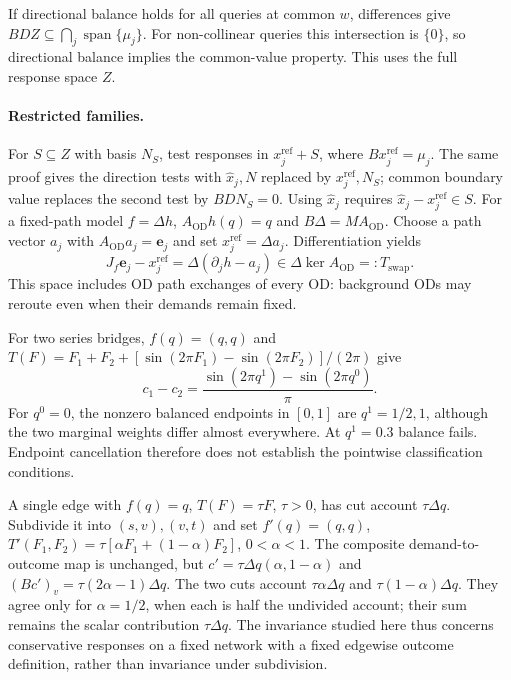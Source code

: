 If directional balance holds for all
queries at common $w$, differences give
$BDZ\subseteq\bigcap_j\operatorname{span}\{\mu_j\}$. For non-collinear
queries this intersection is $\{0\}$, so directional balance implies
the common-value property. This uses the full response space $Z$.

\paragraph{Restricted families.}\label{app:membership}
For $S\subseteq Z$ with basis $N_S$, test responses in
$x_j^{\mathrm{ref}}+S$, where $Bx_j^{\mathrm{ref}}=\mu_j$.
The same proof gives the direction tests with $\hat x_j,N$ replaced
by $x_j^{\mathrm{ref}},N_S$; common boundary value replaces the second test by
$BDN_S=0$. Using $\hat x_j$ requires
$\hat x_j-x_j^{\mathrm{ref}}\in S$. For a fixed-path model $f=\Delta h$,
$A_{\mathrm{OD}}h(q)=q$ and $B\Delta=MA_{\mathrm{OD}}$. Choose a path
vector $a_j$ with $A_{\mathrm{OD}}a_j=\mathbf e_j$ and set
$x_j^{\mathrm{ref}}=\Delta a_j$. Differentiation yields
\[
J_f\mathbf e_j-x_j^{\mathrm{ref}}
=\Delta(\partial_jh-a_j)\in\Delta\ker A_{\mathrm{OD}}=:T_{\mathrm{swap}}.
\]
This space includes OD path exchanges of every OD: background
ODs may reroute even when their demands remain fixed.

\begin{example}\label{ex:cancellation}
For two series bridges, $f(q)=(q,q)$ and
$T(F)=F_1+F_2+[\sin(2\pi F_1)-\sin(2\pi F_2)]/(2\pi)$ give
\[
c_1-c_2
=\frac{\sin(2\pi q^1)-\sin(2\pi q^0)}{\pi}.
\]
For $q^0=0$, the nonzero balanced endpoints in $[0,1]$ are
$q^1=1/2,1$, although the two marginal weights differ almost
everywhere. At $q^1=0.3$ balance fails. Endpoint cancellation therefore
does not establish the pointwise classification conditions.
\end{example}

\begin{example}\label{ex:subdivision}
A single edge with $f(q)=q$, $T(F)=\tau F$, $\tau>0$, has cut account
$\tau\Delta q$. Subdivide it into $(s,v),(v,t)$ and set
$f'(q)=(q,q)$,
$T'(F_1,F_2)=\tau[\alpha F_1+(1-\alpha)F_2]$, $0<\alpha<1$.
The composite demand-to-outcome map is unchanged, but
$c'=\tau\Delta q(\alpha,1-\alpha)$ and
$(Bc')_v=\tau(2\alpha-1)\Delta q$.
The two cuts account $\tau\alpha\Delta q$ and
$\tau(1-\alpha)\Delta q$. They agree only for $\alpha=1/2$, when each
is half the undivided account; their sum remains the scalar
contribution $\tau\Delta q$. The invariance studied here thus concerns
conservative responses on a fixed network with a fixed edgewise
outcome definition, rather than invariance under subdivision.
\end{example}

